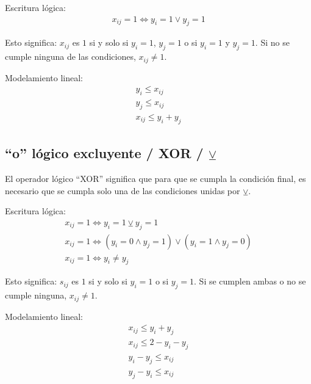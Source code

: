 \documentclass[../main.tex]{subfiles}
\begin{document}
\begin{minipage}[t]{.45\textwidth}
  Escritura lógica:
  \begin{gather*}
    x_{ij} = 1 \Leftrightarrow y_i = 1 \vee y_j = 1  
  \end{gather*}

  Esto significa: $x_{ij}$ es $1$ si y solo si $y_i = 1$, $y_j = 1$ o si $y_i = 1$ y $y_j = 1$. Si no se cumple ninguna de las condiciones, $x_{ij} \not= 1$.
\end{minipage}
\hfill
\begin{minipage}[t]{.45\textwidth}
  Modelamiento lineal:
  \begin{gather*}
    y_i \leq x_{ij} \\
    y_j \leq x_{ij} \\
    x_{ij} \leq y_i + y_j
  \end{gather*}
\end{minipage}

\subsection[XOR]{``o'' lógico excluyente / XOR / $\veebar$}
El operador lógico ``XOR'' significa que para que se cumpla la condición final, es necesario que se cumpla solo una de las condiciones unidas por $\veebar$.

\begin{minipage}[t]{.45\textwidth}
  Escritura lógica:
  \begin{gather*}
    x_{ij} = 1 \Leftrightarrow y_i = 1 \veebar y_j = 1 \\
    x_{ij} = 1 \Leftrightarrow (y_i = 0 \wedge y_j = 1) \vee (y_i = 1 \wedge y_j = 0) \\
    x_{ij} = 1 \Leftrightarrow y_i \not= y_j
  \end{gather*}

  Esto significa: $s_{ij}$ es $1$ si y solo si $y_i = 1$ o si $y_j = 1$. Si se cumplen ambas o no se cumple ninguna, $x_{ij} \not= 1$.
\end{minipage}
\hfill
\begin{minipage}[t]{.45\textwidth}
  Modelamiento lineal:
  \begin{gather*}
    x_{ij} \leq y_i + y_j \\
    x_{ij} \leq 2 - y_i - y_j \\
    y_i - y_j \leq x_{ij} \\
    y_j - y_i \leq x_{ij}
  \end{gather*}
\end{minipage}
\end{document}
